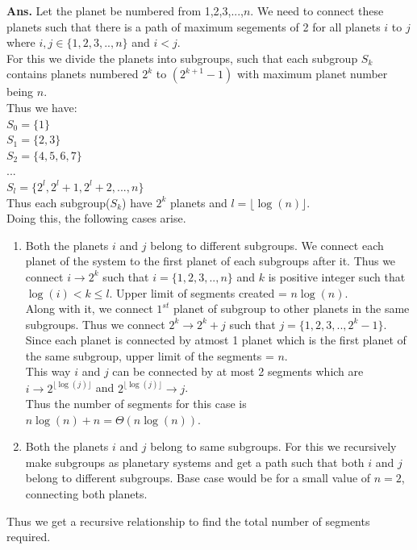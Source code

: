 \documentclass[11pt]{article}
\begin{document}
\noindent \textbf{Ans.}
Let the planet be numbered from 1,2,3,...,$n$. We need to connect these planets such that there is a path of maximum segements of 2 for all planets $i$ to $j$ where $i, j \in \{1,2,3,..,n\}$ and $i<j$.\\
For this we divide the planets into subgroups, such that each subgroup $S_k$ contains planets numbered $2^k$ to $(2^{k+1}-1)$ with maximum planet number being $n$.\\
Thus we have:\\
$S_0 = \{1\}$\\
$S_1 = \{2, 3\}$\\
$S_2 = \{4, 5, 6, 7\}$\\
$...$\\
$S_l = \{2^l, 2^l+1, 2^l+2, ..., n\}$\\
Thus each subgroup($S_k$) have $2^k$ planets and $l = \lfloor \log(n)\rfloor$.\\
Doing this, the following cases arise.
\begin{enumerate}
    \item Both the planets $i$ and $j$ belong to different subgroups. We connect each planet of the system to the first planet of each subgroups after it. Thus we connect $i \rightarrow 2^k$ such that $i = \{1,2,3,.., n\}$ and $k$ is positive integer such that $\log(i)<k \leq l$. Upper limit of segments created = $n\log(n)$.\\
    Along with it, we connect $1^{st}$ planet of subgroup to other planets in the same subgroups. Thus we connect $2^k \rightarrow 2^k+j$ such that $j=\{1,2,3,..,2^k-1\}$. Since each planet is connected by atmost 1 planet which is the first planet of the same subgroup, upper limit of the segments = $n$.\\
    This way $i$ and $j$ can be connected by at most 2 segments which are\\
    $i \rightarrow 2^{\lfloor \log(j) \rfloor}$ and $2^{\lfloor \log(j) \rfloor} \rightarrow j$.\\
    Thus the number of segments for this case is $n\log(n)+n = \Theta(n\log(n))$.
    \item Both the planets $i$ and $j$ belong to same subgroups. For this we recursively make subgroups as planetary systems and get a path such that both $i$ and $j$ belong to different subgroups. Base case would be for a small value of $n=2$, connecting both planets.
\end{enumerate}
Thus we get a recursive relationship to find the total number of segments required.\\
\end{document}
